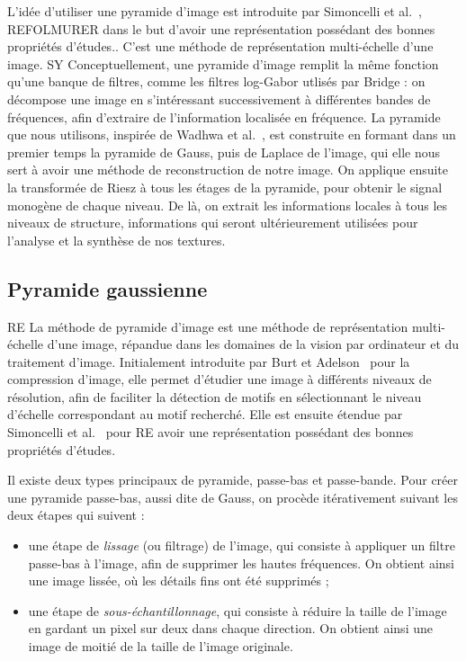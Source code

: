 L'idée d'utiliser une pyramide d'image est introduite par Simoncelli et al.~\cite{simoncelli_shiftable_1992}, {\color{red}REFOLMURER dans le but d'avoir une représentation possédant des bonnes propriétés d'études.}. C'est une méthode de représentation multi-échelle d'une image.
SY Conceptuellement, une pyramide d'image remplit la même fonction qu'une banque de filtres, comme les filtres log-Gabor utlisés par Bridge : on décompose une image en s'intéressant successivement à différentes bandes de fréquences, afin d'extraire de l'information localisée en fréquence. La pyramide que nous utilisons, inspirée de Wadhwa et al.~\cite{wadhwa_phase_based_2013}, est construite en formant dans un premier temps la pyramide de Gauss, puis de Laplace de l'image, qui elle nous sert à avoir une méthode de reconstruction de notre image. On applique ensuite la transformée de Riesz à tous les étages de la pyramide, pour obtenir le signal monogène de chaque niveau. De là, on extrait les informations locales à tous les niveaux de structure, informations qui seront ultérieurement utilisées pour l'analyse et la synthèse de nos textures.

\subsection{Pyramide gaussienne}

RE La méthode de pyramide d'image est une méthode de représentation multi-échelle d'une image, répandue dans les domaines de la vision par ordinateur et du traitement d'image. Initialement introduite par Burt et Adelson~\cite{burt_laplacian_1983} pour la compression d'image, elle permet d'étudier une image à différents niveaux de résolution, afin de faciliter la détection de motifs en sélectionnant le niveau d'échelle correspondant au motif recherché. Elle est ensuite étendue par Simoncelli et al.~\cite{simoncelli_shiftable_1992} pour RE avoir une représentation possédant des bonnes propriétés d'études. 

Il existe deux types principaux de pyramide, passe-bas et passe-bande. Pour créer une pyramide passe-bas, aussi dite de Gauss, on procède itérativement suivant les deux étapes qui suivent :

\begin{itemize}
    \item une étape de \textit{lissage} (ou filtrage) de l'image, qui consiste à appliquer un filtre passe-bas à l'image, afin de supprimer les hautes fréquences. On obtient ainsi une image lissée, où les détails fins ont été supprimés ;
    \item une étape de \textit{sous-échantillonnage}, qui consiste à réduire la taille de l'image en gardant un pixel sur deux dans chaque direction. On obtient ainsi une image de moitié de la taille de l'image originale.
\end{itemize}

